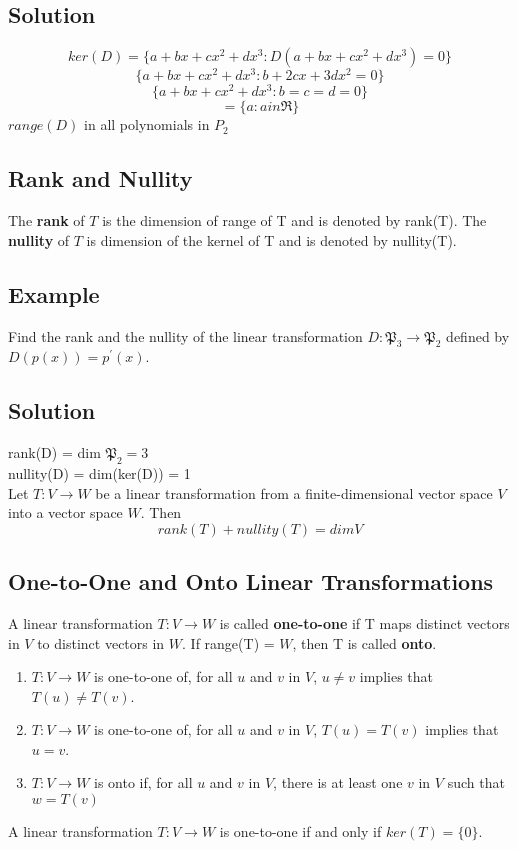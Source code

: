 \subsection*{Solution}
$$ker(D) = \{a+bx+cx^2+dx^3:D(a+bx+cx^2+dx^3) = 0\}$$
$$\{a+bx+cx^2+dx^3 : b+2cx+3dx^2 = 0\}$$ $$\{a+bx+cx^2+dx^3 : b = c = d =0\}$$ $$= \{a : a in \mathfrak{R}\}$$
$range(D)$ in all polynomials in $P_2$
\subsection*{Rank and Nullity}
The \textbf{rank} of $T$ is the dimension of range of T and is denoted by rank(T). The \textbf{nullity} of $T$ is dimension of the kernel of T and is denoted by nullity(T).
\subsection*{Example}
Find the rank and the nullity of the linear transformation $D: \mathfrak{P}_3\rightarrow\mathfrak{P}_2$ defined by $D(p(x)) = p^\prime(x)$.
\subsection*{Solution}
rank(D) = dim $\mathfrak{P}_2 = 3$\\
nullity(D) = dim(ker(D)) = 1\\
Let $T: V\rightarrow W$ be a linear transformation from a finite-dimensional vector space $V$ into a vector space $W$. Then
$$rank(T) + nullity (T) = dim V$$
\subsection*{One-to-One and Onto Linear Transformations}
A linear transformation $T:V\rightarrow W$ is called \textbf{one-to-one} if T maps distinct vectors in $V$ to distinct vectors in $W$. If range(T) = $W$, then T is called \textbf{onto}.
\begin{enumerate}[a]
    \item $T:V\rightarrow W$ is one-to-one of, for all $u$ and $v$ in $V$, $u\neq v$ implies that $T(u)\neq T(v)$.
    \item $T:V\rightarrow W$ is one-to-one of, for all $u$ and $v$ in $V$, $T(u) =  T(v)$ implies that $u=v$.
    \item $T:V\rightarrow W$ is onto if, for all $u$ and $v$ in $V$, there is at least one $v$ in $V$ such that $w = T(v)$
\end{enumerate}
A linear transformation $T:V\rightarrow W$ is one-to-one if and only if $ker(T) = \{0\}$. 

